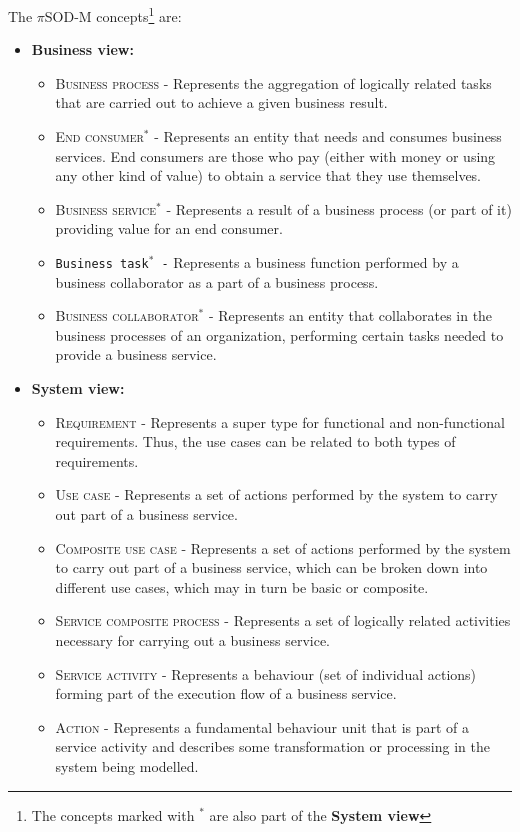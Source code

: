  The $\pi$SOD-M concepts\footnote{The concepts marked with $^\ast$ are also part of
 the  \textbf{System view}} are:
 
\begin{itemize}
   \item \textbf{Business view:}
		\begin{itemize}
		  \item \textsc{Business process -} Represents the aggregation of
		  logically related tasks that are carried out to achieve a given business result.
		  \item \textsc{End consumer$^\ast$ -} Represents an entity that needs and
		  consumes business services. End consumers are those who pay (either with money or using
		  any other kind of value) to obtain a service that they use
		  themselves.
		  \item \textsc{Business service$^\ast$ -} Represents a result of a
		  business process (or part of it) providing value for an end consumer.
		  \item \texttt{Business task$^\ast$ -} Represents a business function
		  performed by a business collaborator as a part of a business process.
		  \item \textsc{Business collaborator$^\ast$ -} Represents an entity that
		  collaborates in the business processes of an organization, performing certain tasks needed
		  to provide a business service.
		  
		\end{itemize}

\item \textbf{System view:}	
	\begin{itemize}
	  \item \textsc{Requirement -} Represents a super type for functional and
	  non-functional requirements. Thus, the use cases can be related to both types
	  of requirements.	
	  \item \textsc{Use case -} Represents a set of actions performed by the system
	  to carry out part of a business service.
	  \item \textsc{Composite use case -} Represents a set of actions performed by
	  the system to carry out part of a business service, which can be broken down
	  into different use cases, which may in turn be basic or composite.
	  \item \textsc{Service composite process -} Represents a set of logically
	  related activities necessary for carrying out a business service.
	  \item \textsc{Service activity -} Represents a behaviour (set of individual
	  actions) forming part of the execution flow of a business service.
	  \item \textsc{Action -} Represents a fundamental behaviour unit that is part
	  of a service activity and describes some transformation or processing in the
	  system being modelled.
	\end{itemize}
	

\end{itemize}
